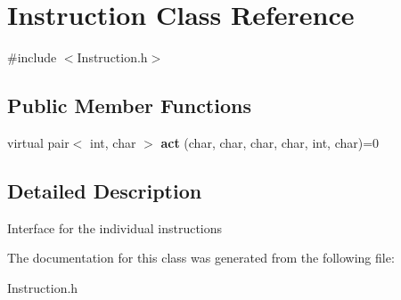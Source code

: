\hypertarget{classInstruction}{\section{Instruction Class Reference}
\label{classInstruction}
}


{\ttfamily \#include $<$Instruction.\-h$>$}

\subsection*{Public Member Functions}
\begin{DoxyCompactItemize}
\item 
\hypertarget{classInstruction_af0047418ce174426a4f3bdf48304db8e}{virtual pair$<$ int, char $>$ {\bfseries act} (char, char, char, char, int, char)=0}\label{classInstruction_af0047418ce174426a4f3bdf48304db8e}

\end{DoxyCompactItemize}


\subsection{Detailed Description}
Interface for the individual instructions 

The documentation for this class was generated from the following file\-:\begin{DoxyCompactItemize}
\item 
Instruction.\-h\end{DoxyCompactItemize}
